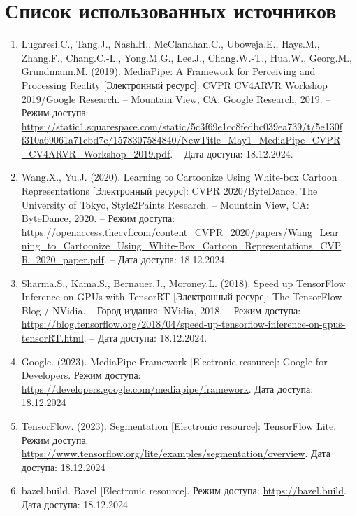\documentclass[a4paper,14pt]{extreport}
\begin{document}
    \chapter*{Список использованных источников}
    \begin{enumerate}
        \item Lugaresi.C., Tang.J., Nash.H., McClanahan.C., Uboweja.E., Hays.M., Zhang.F., Chang.C.-L., Yong.M.G., Lee.J., Chang.W.-T., Hua.W., Georg.M., Grundmann.M. (2019). MediaPipe: A Framework for Perceiving and Processing Reality [Электронный ресурс]: CVPR CV4ARVR Workshop 2019/Google Research. – Mountain View, CA: Google Research, 2019. – Режим доступа: \href{https://static1.squarespace.com/static/5c3f69e1cc8fedbc039ea739/t/5e130ff310a69061a71cbd7c/1578307584840/NewTitle_May1_MediaPipe_CVPR_CV4ARVR_Workshop_2019.pdf}{https://static1.squarespace.com/static/5c3f69e1cc8fedbc039ea739/t/5e130f\\f310a69061a71cbd7c/1578307584840/NewTitle\_May1\_MediaPipe\_CVPR\\\_CV4ARVR\_Workshop\_2019.pdf}. – Дата доступа: 18.12.2024.
        \item \hypertarget{[2]}{}Wang.X., Yu.J. (2020). Learning to Cartoonize Using White-box Cartoon Representations [Электронный ресурс]: CVPR 2020/ByteDance, The University of Tokyo, Style2Paints Research. – Mountain View, CA: ByteDance, 2020. – Режим доступа: \href{https://openaccess.thecvf.com/content_CVPR_2020/papers/Wang_Learning_to_Cartoonize_Using_White-Box_Cartoon_Representations_CVPR_2020_paper.pdf}{https://openaccess.thecvf.com/content\_CVPR\_2020/papers/Wang\_Lear\\ning\_to\_Cartoonize\_Using\_White-Box\_Cartoon\_Representations\_CVP\\R\_2020\_paper.pdf}. – Дата доступа: 18.12.2024.
        \item Sharma.S., Kama.S., Bernauer.J., Moroney.L. (2018). Speed up TensorFlow Inference on GPUs with TensorRT [Электронный ресурс]: The TensorFlow Blog / NVidia. – Город издания: NVidia, 2018. – Режим доступа: \href{https://blog.tensorflow.org/2018/04/speed-up-tensorflow-inference-on-gpus-tensorRT.html}{https://blog.tensorflow.org/2018/04/speed-up-tensorflow-inference-on-gpus-tensorRT.html}. – Дата доступа: 18.12.2024.
        \item Google. (2023). MediaPipe Framework [Electronic resource]: Google for Developers. Режим доступа: \href{https://developers.google.com/mediapipe/framework}{https://developers.google.com/mediapipe/framework}. Дата доступа: 18.12.2024
        \item TensorFlow. (2023). Segmentation [Electronic resource]: TensorFlow Lite. Режим доступа: \href{https://www.tensorflow.org/lite/examples/segmentation/overview}{https://www.tensorflow.org/lite/examples/segmentation/overview}. Дата доступа: 18.12.2024
        \item bazel.build. Bazel [Electronic resource]. Режим доступа: \href{https://bazel.build}{https://bazel.build}. Дата доступа: 18.12.2024
    \end{enumerate}
    
\end{document}
